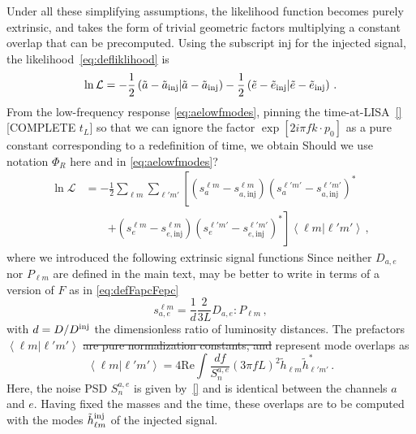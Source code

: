 \documentclass[aps,showpacs,twocolumn,prd,superscriptaddress,nofootinbib]{revtex4-1}
\newcommand{\be}{\begin{equation}}
\newcommand{\ee}{\end{equation}}
\newcommand\calL{{\mathcal{L}}}
\newcommand{\nn}{\nonumber}
\newcommand{\SM}[1]{{\color{Blue} #1}}
\newcommand{\jgb}[1]{{\color{DarkGreen} #1}}
\begin{document}
Under all these simplifying assumptions, the likelihood function becomes purely extrinsic, and takes the form of trivial geometric factors multiplying a constant overlap that can be precomputed. Using the subscript $\mathrm{inj}$ for the injected signal, the likelihood~\eqref{eq:defliklihood} is
\be
	\ln \calL = -\frac{1}{2} \left( \tilde{a} - \tilde{a}_{\rm inj} | \tilde{a} - \tilde{a}_{\rm inj} \right) -\frac{1}{2} \left( \tilde{e} - \tilde{e}_{\rm inj} | \tilde{e} - \tilde{e}_{\rm inj} \right) \,.
\ee
From the low-frequency response \eqref{eq:aelowfmodes}, pinning the time-at-LISA~\eqref{} \SM{[COMPLETE $t_{L}$]} so that we can ignore the factor $\exp [2 i \pi f k\cdot p_{0}]$ as a pure constant corresponding to a redefinition of time, we obtain \jgb{Should we use notation $\Phi_R$ here and in \eqref{eq:aelowfmodes}?} 
\begin{align}\label{eq:simplelikelihoodhm}
	\ln \calL &= -\frac{1}{2} \sum_{\ell m} \sum_{\ell' m'}   \left[ \left( s_{a}^{\ell m} - s_{a, \mathrm{inj}}^{\ell m}\right) \left( s_{a}^{\ell' m'} - s_{a, \mathrm{inj}}^{\ell' m'}\right)^{*} \right. \nn\\
	& \qquad \left. + \left( s_{e}^{\ell m} - s_{e, \mathrm{inj}}^{\ell m}\right) \left( s_{e}^{\ell' m'} - s_{e, \mathrm{inj}}^{\ell' m'}\right)^{*} \right] \left\langle \ell m | \ell' m' \right\rangle \,,
\end{align}
where we introduced the following extrinsic signal functions \jgb{Since neither $D_{a,e}$ nor $P_{\ell m}$ are defined in the main text, may be better to write in terms of a version of $F$ as in \eqref{eq:defFapcFepc}}
\be\label{eq:defsaelm}
	s_{a,e}^{\ell m} = \frac{1}{d} \frac{2}{3L} D_{a,e} : P_{\ell m} \,,
\ee
with $d = D / D^{\rm inj}$ the dimensionless ratio of luminosity distances. The prefactors $\left\langle \ell m | \ell' m' \right\rangle$ \sout{are pure normalization constants, and} represent mode overlaps as
\be\label{eq:innerproductlmlpmp}
	\left\langle \ell m | \ell' m' \right\rangle = 4\mathrm{Re} \int \frac{df}{S_{n}^{a,e}} \left( 3 \pi f L\right)^{2} \tilde{h}_{\ell m} \tilde{h}_{\ell' m'}^{*} \,.
\ee
Here, the noise PSD $S_{n}^{a,e}$ is given by~\eqref{} and is identical between the channels $a$ and $e$. Having fixed the masses and the time, these overlaps are to be computed with the modes $\tilde{h}_{\ell m}^{\rm inj}$ of the injected signal.
\end{document}
